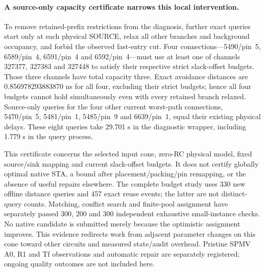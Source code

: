 \paragraph{A source-only capacity certificate narrows this local intervention.}
To remove retained-prefix restrictions from the diagnosis, further exact queries start only at each physical SOURCE, relax all other branches and background occupancy, and forbid the observed fast-entry cut. Four connections---5490/pin~5, 6589/pin~4, 6591/pin~4 and 6592/pin~4---must use at least one of channels 327377, 327383 and 327448 to satisfy their respective strict slack-offset budgets. Those three channels have total capacity three. Exact avoidance distances are 0.856978293883870 ns for all four, excluding their strict budgets; hence all four budgets cannot hold simultaneously even with every retained branch relaxed. Source-only queries for the four other current worst-path connections, 5470/pin~5, 5481/pin~1, 5485/pin~9 and 6639/pin~1, equal their existing physical delays. These eight queries take 29.701 s in the diagnostic wrapper, including 1.779 s in the query process.

This certificate concerns the selected input cone, zero-RC physical model, fixed source/sink mapping and current slack-offset budgets. It does not certify globally optimal native STA, a bound after placement/packing/pin remapping, or the absence of useful repairs elsewhere. The complete budget study uses 330 new offline distance queries and 457 exact reuse events; the latter are not distinct-query counts. Matching, conflict search and finite-pool assignment have separately passed 300, 200 and 300 independent exhaustive small-instance checks. No native candidate is submitted merely because the optimistic assignment improves. This evidence redirects work from adjacent parameter changes on this cone toward other circuits and measured state/audit overhead. Pristine SPMV A0, R1 and Tf observations and automatic repair are separately registered; ongoing quality outcomes are not included here.

